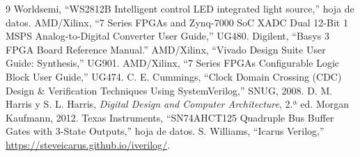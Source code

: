 \documentclass[conference]{IEEEtran}
\begin{document}
\begin{thebibliography}{9}
 Worldsemi, ``WS2812B Intelligent control LED integrated light source,'' hoja de datos.
 AMD/Xilinx, ``7 Series FPGAs and Zynq-7000 SoC XADC Dual 12-Bit 1 MSPS Analog-to-Digital Converter User Guide,'' UG480.
 Digilent, ``Basys 3 FPGA Board Reference Manual.''
 AMD/Xilinx, ``Vivado Design Suite User Guide: Synthesis,'' UG901.
 AMD/Xilinx, ``7 Series FPGAs Configurable Logic Block User Guide,'' UG474.
 C. E. Cummings, ``Clock Domain Crossing (CDC) Design \& Verification Techniques Using SystemVerilog,'' SNUG, 2008.
 D. M. Harris y S. L. Harris, \emph{Digital Design and Computer Architecture}, 2.ª ed. Morgan Kaufmann, 2012.
 Texas Instruments, ``SN74AHCT125 Quadruple Bus Buffer Gates with 3-State Outputs,'' hoja de datos.
 S. Williams, ``Icarus Verilog,'' \url{https://steveicarus.github.io/iverilog/}.
\end{thebibliography}
\end{document}
